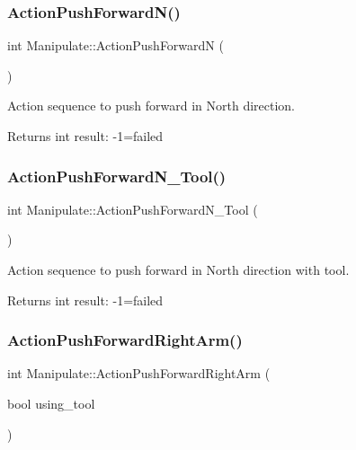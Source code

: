 \subsubsection{\texorpdfstring{Action\+Push\+Forward\+N()}{ActionPushForwardN()}}
{\footnotesize\ttfamily int Manipulate\+::\+Action\+Push\+ForwardN (\begin{DoxyParamCaption}{ }\end{DoxyParamCaption})\hspace{0.3cm}{\ttfamily [private]}}



Action sequence to push forward in North direction. 

\begin{DoxyReturn}{Returns}
int result\+: -\/1=failed 
\end{DoxyReturn}
\mbox{\label{structManipulate_a2ea0628e45e9350185fb172819448256}} 
\subsubsection{\texorpdfstring{Action\+Push\+Forward\+N\+\_\+\+Tool()}{ActionPushForwardN\_Tool()}}
{\footnotesize\ttfamily int Manipulate\+::\+Action\+Push\+Forward\+N\+\_\+\+Tool (\begin{DoxyParamCaption}{ }\end{DoxyParamCaption})\hspace{0.3cm}{\ttfamily [private]}}



Action sequence to push forward in North direction with tool. 

\begin{DoxyReturn}{Returns}
int result\+: -\/1=failed 
\end{DoxyReturn}
\mbox{\label{structManipulate_a128e631593f945ea431116aef97a4511}} 
\subsubsection{\texorpdfstring{Action\+Push\+Forward\+Right\+Arm()}{ActionPushForwardRightArm()}}
{\footnotesize\ttfamily int Manipulate\+::\+Action\+Push\+Forward\+Right\+Arm (\begin{DoxyParamCaption}\item[{bool}]{using\+\_\+tool }\end{DoxyParamCaption})\hspace{0.3cm}{\ttfamily [private]}}



